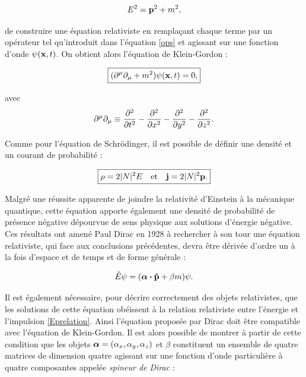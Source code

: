         \begin{equation}
            E^2=\vb{p}^2+m^2,
            \label{Eprelation}
        \end{equation}

        de construire une équation relativiste en remplaçant chaque terme par un opérateur tel qu'introduit dans l'équation \ref{ops} et agissant sur une fonction d'onde $\psi(\vb{x},t)$. On obtient alors l'équation de Klein-Gordon :
        
        \begin{equation}
        \boxed{
            (\partial^{\mu}\partial_{\mu}+m^2)\psi(\vb{x},t)=0
        ,}
        \label{KG}
        \end{equation}
        
        avec $$\partial^{\mu}\partial_{\mu}\equiv\pdv[2]{t}-\pdv[2]{x}-\pdv[2]{y}-\pdv[2]{z}.$$
        
        Comme pour l'équation de Schrödinger, il est possible de définir une densité et un courant de probabilité :

        \begin{equation}
        \boxed{
            \rho=2|N|^2E \quad \mbox{et} \quad \vb{j}=2|N|^2\vb{p}.
        }
        \end{equation}
        
        Malgré une réussite apparente de joindre la relativité d'Einstein à la mécanique quantique, cette équation apporte également une densité de probabilité de présence négative dépourvue de sens physique aux solutions d'énergie négative. Ces résultats ont amené Paul Dirac en 1928 à rechercher à son tour une équation relativiste, qui face aux conclusions précédentes, devra être dérivée d'ordre un à la fois d'espace et de temps et de forme générale :
        
        \begin{equation}
            \hat{E}\psi=(\vb*{\alpha}\vdot\vb{\hat{p}}+\beta m)\psi.
            \label{dirac1}
        \end{equation}
        
        Il est également nécessaire, pour décrire correctement des objets relativistes, que les solutions de cette équation obéissent à la relation relativiste entre l'énergie et l'impulsion \ref{Eprelation}. Ainsi l'équation proposée par Dirac doit être compatible avec l'équation de Klein-Gordon. Il est alors possible de montrer à partir de cette condition que les objets $\vb*{\alpha}=(\alpha_x, \alpha_y, \alpha_z)$ et $\beta$ constituent un ensemble de  quatre matrices de dimension quatre agissant sur une fonction d'onde particulière à quatre composantes appelée \textit{spineur de Dirac} :
  
